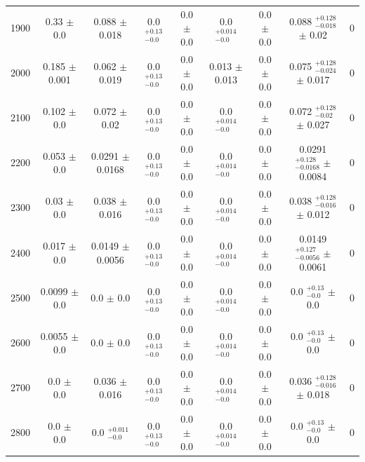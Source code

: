 \begin{table}[H]
\begin{center}
\begin{tabular}{ccccccccc}
            1900  &     0.33 $\pm$ 0.0  &     	 0.088 $\pm$ 0.018  &           0.0 $ _{-0.0}^{+0.13}$   &  0.0 $\pm$ 0.0  &        0.0 $ _{-0.0}^{+0.014}$   & 0.0 $\pm$ 0.0  &        0.088 $ _{-0.018}^{+0.128}$   $\pm$ 0.02  &         0 \\
            2000  &     0.185 $\pm$ 0.001  &  	 0.062 $\pm$ 0.019  &           0.0 $ _{-0.0}^{+0.13}$   &  0.0 $\pm$ 0.0  &        0.013 $\pm$ 0.013  &        0.0 $\pm$ 0.0  &        0.075 $ _{-0.024}^{+0.128}$   $\pm$ 0.017  &        0 \\
            2100  &     0.102 $\pm$ 0.0  &    	 0.072 $\pm$ 0.02  &            0.0 $ _{-0.0}^{+0.13}$   &  0.0 $\pm$ 0.0  &        0.0 $ _{-0.0}^{+0.014}$   & 0.0 $\pm$ 0.0  &        0.072 $ _{-0.02}^{+0.128}$   $\pm$ 0.027  &         0 \\
            2200  &     0.053 $\pm$ 0.0  &    	 0.0291 $\pm$ 0.0168  &         0.0 $ _{-0.0}^{+0.13}$   &  0.0 $\pm$ 0.0  &        0.0 $ _{-0.0}^{+0.014}$   & 0.0 $\pm$ 0.0  &        0.0291 $ _{-0.0168}^{+0.128}$   $\pm$ 0.0084  &     0 \\
            2300  &     0.03 $\pm$ 0.0  &     	 0.038 $\pm$ 0.016  &           0.0 $ _{-0.0}^{+0.13}$   &  0.0 $\pm$ 0.0  &        0.0 $ _{-0.0}^{+0.014}$   & 0.0 $\pm$ 0.0  &        0.038 $ _{-0.016}^{+0.128}$   $\pm$ 0.012  &        0 \\
            2400  &     0.017 $\pm$ 0.0  &    	 0.0149 $\pm$ 0.0056  &         0.0 $ _{-0.0}^{+0.13}$   &  0.0 $\pm$ 0.0  &        0.0 $ _{-0.0}^{+0.014}$   & 0.0 $\pm$ 0.0  &        0.0149 $ _{-0.0056}^{+0.127}$   $\pm$ 0.0061  &     0 \\
            2500  &     0.0099 $\pm$ 0.0  &   	 0.0 $\pm$ 0.0  &               0.0 $ _{-0.0}^{+0.13}$   &  0.0 $\pm$ 0.0  &        0.0 $ _{-0.0}^{+0.014}$   & 0.0 $\pm$ 0.0  &        0.0 $ _{-0.0}^{+0.13}$   $\pm$ 0.0  &               0 \\
            2600  &     0.0055 $\pm$ 0.0  &   	 0.0 $\pm$ 0.0  &               0.0 $ _{-0.0}^{+0.13}$   &  0.0 $\pm$ 0.0  &        0.0 $ _{-0.0}^{+0.014}$   & 0.0 $\pm$ 0.0  &        0.0 $ _{-0.0}^{+0.13}$   $\pm$ 0.0  &               0 \\
            2700  &     0.0 $\pm$ 0.0  &      	 0.036 $\pm$ 0.016  &           0.0 $ _{-0.0}^{+0.13}$   &  0.0 $\pm$ 0.0  &        0.0 $ _{-0.0}^{+0.014}$   & 0.0 $\pm$ 0.0  &        0.036 $ _{-0.016}^{+0.128}$   $\pm$ 0.018  &        0 \\
            2800  &     0.0 $\pm$ 0.0  &      	 0.0 $ _{-0.0}^{+0.011}$   &    0.0 $ _{-0.0}^{+0.13}$   &  0.0 $\pm$ 0.0  &        0.0 $ _{-0.0}^{+0.014}$   & 0.0 $\pm$ 0.0  &        0.0 $ _{-0.0}^{+0.13}$   $\pm$ 0.0  &               0 \\

\end{tabular}
\end{center}
\end{table}
